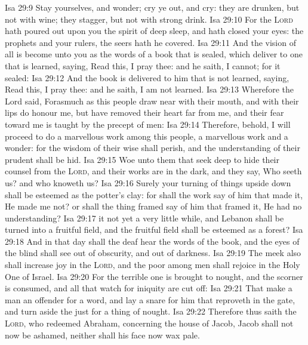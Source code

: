 \vs Isa 29:9 Stay yourselves, and wonder; cry ye out, and cry: they are drunken, but not with wine; they stagger, but not with strong drink.
\vs Isa 29:10 For the \textsc{Lord} hath poured out upon you the spirit of deep sleep, and hath closed your eyes: the prophets and your rulers, the seers hath he covered.
\vs Isa 29:11 And the vision of all is become unto you as the words of a book that is sealed, which  deliver to one that is learned, saying, Read this, I pray thee: and he saith, I cannot; for it  sealed:
\vs Isa 29:12 And the book is delivered to him that is not learned, saying, Read this, I pray thee: and he saith, I am not learned.
\vs Isa 29:13 Wherefore the Lord said, Forasmuch as this people draw near  with their mouth, and with their lips do honour me, but have removed their heart far from me, and their fear toward me is taught by the precept of men:
\vs Isa 29:14 Therefore, behold, I will proceed to do a marvellous work among this people,  a marvellous work and a wonder: for the wisdom of their wise  shall perish, and the understanding of their prudent  shall be hid.
\vs Isa 29:15 Woe unto them that seek deep to hide their counsel from the \textsc{Lord}, and their works are in the dark, and they say, Who seeth us? and who knoweth us?
\vs Isa 29:16 Surely your turning of things upside down shall be esteemed as the potter's clay: for shall the work say of him that made it, He made me not? or shall the thing framed say of him that framed it, He had no understanding?
\vs Isa 29:17  it not yet a very little while, and Lebanon shall be turned into a fruitful field, and the fruitful field shall be esteemed as a forest?
\vs Isa 29:18 And in that day shall the deaf hear the words of the book, and the eyes of the blind shall see out of obscurity, and out of darkness.
\vs Isa 29:19 The meek also shall increase  joy in the \textsc{Lord}, and the poor among men shall rejoice in the Holy One of Israel.
\vs Isa 29:20 For the terrible one is brought to nought, and the scorner is consumed, and all that watch for iniquity are cut off:
\vs Isa 29:21 That make a man an offender for a word, and lay a snare for him that reproveth in the gate, and turn aside the just for a thing of nought.
\vs Isa 29:22 Therefore thus saith the \textsc{Lord}, who redeemed Abraham, concerning the house of Jacob, Jacob shall not now be ashamed, neither shall his face now wax pale.
